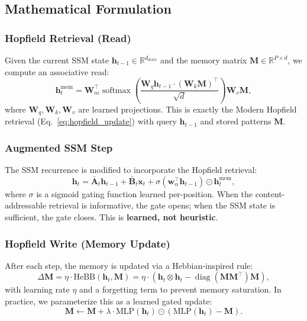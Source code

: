 \documentclass[11pt,a4paper]{article}
\numberwithin{equation}{section}
\newcommand{\R}{\mathbb{R}}
\newcommand{\softmax}{\operatorname{softmax}}
\newcommand{\diag}{\operatorname{diag}}
\begin{document}
\subsection{Mathematical Formulation}

\subsubsection*{Hopfield Retrieval (Read)}

Given the current SSM state $\bm{h}_{t-1} \in \R^{d_{\text{state}}}$ and the
memory matrix $\bm{M} \in \R^{P \times d}$, we compute an associative read:
\begin{equation}
    \bm{h}_t^{\text{mem}} = \bm{W}_m^\top \softmax\left(
    \frac{\bm{W}_q \bm{h}_{t-1} \cdot (\bm{W}_k \bm{M})^\top}{\sqrt{d}}
    \right) \bm{W}_v \bm{M},
\end{equation}
where $\bm{W}_q, \bm{W}_k, \bm{W}_v$ are learned projections. This is exactly the
Modern Hopfield retrieval (Eq.~\ref{eq:hopfield_update}) with query $\bm{h}_{t-1}$ and
stored patterns $\bm{M}$.

\subsubsection*{Augmented SSM Step}

The SSM recurrence is modified to incorporate the Hopfield retrieval:
\begin{equation}
    \bm{h}_t = \bar{\bm{A}}_t \bm{h}_{t-1} + \bar{\bm{B}}_t \bm{x}_t
    + \sigma(\bm{w}_\alpha^\top \bm{h}_{t-1}) \odot \bm{h}_t^{\text{mem}},
    \label{eq:hopfield_ssm}
\end{equation}
where $\sigma$ is a sigmoid gating function learned per-position. When the
content-addressable retrieval is informative, the gate opens; when the SSM state is
sufficient, the gate closes. This is \textbf{learned, not heuristic}.

\subsubsection*{Hopfield Write (Memory Update)}

After each step, the memory is updated via a Hebbian-inspired rule:
\begin{equation}
    \Delta \bm{M} = \eta \cdot \text{HeBB}(\bm{h}_t, \bm{M})
    = \eta \cdot \left( \bm{h}_t \otimes \bm{h}_t - \diag(\bm{M} \bm{M}^\top) \bm{M} \right),
\end{equation}
with learning rate $\eta$ and a forgetting term to prevent memory saturation.
In practice, we parameterize this as a learned gated update:
\begin{equation}
    \bm{M} \gets \bm{M} + \lambda \cdot \text{MLP}(\bm{h}_t) \odot (\text{MLP}(\bm{h}_t) - \bm{M}).
\end{equation}
\end{document}
